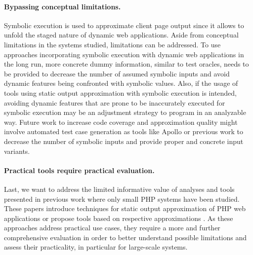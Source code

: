 \documentclass[sigconf]{acmart}
\renewcommand{\sf}[1]{\textsf{#1}}
\begin{document}
\paragraph{Bypassing conceptual limitations.}
Symbolic execution is used to approximate client page output since it allows to
unfold the staged nature of dynamic web applications. Aside from conceptual
limitations in the systems studied, limitations can be addressed. To use
approaches incorporating symbolic execution with dynamic web applications in
the long run, more concrete dummy information, similar to test oracles, needs
to be provided to decrease the number of assumed symbolic inputs and avoid
dynamic features being confronted with symbolic values. Also, if the usage of
tools using static output approximation with symbolic execution is intended,
avoiding dynamic features that are prone to be inaccurately executed for
symbolic execution  may be an adjustment strategy to program in an analyzable
way. 
Future work to increase code coverage and approximation quality might involve
automated test case generation as tools like \sf{Apollo}
\cite{artzi_finding_2008,artzi_finding_2010} or previous
work \cite{DynamicWassermann} to decrease the number of symbolic inputs and
provide proper and concrete input variants.

\paragraph{Practical tools require practical evaluation.}
Last, we want to address the limited informative value of analyses and tools
presented in previous work
\cite{Nguyen:2011:AFH:2190078.2190142,Nguyen:2014:BCG:2635868.2635928,Nguyen:2015:CPS:2786805.2786872,Nguyen:2015:VIS:2819009.2819140,minamide_static_2005,wassermann2007sound}
where only small PHP systems have been studied. These papers introduce
techniques for static output approximation of PHP web applications
\cite{minamide_static_2005,Nguyen:2014:BCG:2635868.2635928,wang_automating_2012} or propose tools
based on respective approximations
\cite{Nguyen:2011:AFH:2190078.2190142,Nguyen:2014:BCG:2635868.2635928,Nguyen:2015:CPS:2786805.2786872,Nguyen:2015:VIS:2819009.2819140,wassermann2007sound,wassermann_static_2008}.
As these approaches address practical use cases, they require a more and further comprehensive evaluation in order to  better understand possible limitations and assess their practicality, in particular for large-scale systems.
\end{document}
